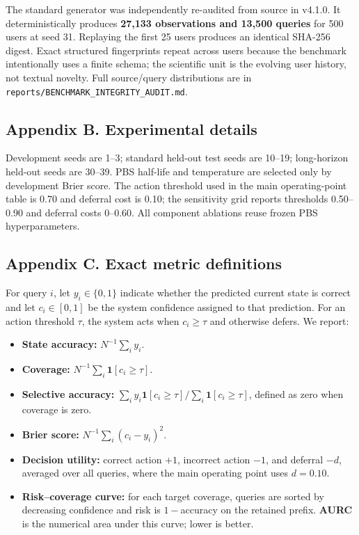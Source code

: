 \documentclass[
  10pt,
  letterpaper,
]{article}
\providecommand{\tightlist}{%
  \setlength{\itemsep}{0pt}\setlength{\parskip}{0pt}}
\begin{document}
The standard generator was independently re-audited from source in
v4.1.0. It deterministically produces \textbf{27,133 observations and
13,500 queries} for 500 users at seed 31. Replaying the first 25 users
produces an identical SHA-256 digest. Exact structured fingerprints
repeat across users because the benchmark intentionally uses a finite
schema; the scientific unit is the evolving user history, not textual
novelty. Full source/query distributions are in
\texttt{reports/BENCHMARK\_INTEGRITY\_AUDIT.md}.

\subsection{Appendix B. Experimental
details}\label{appendix-b.-experimental-details}

Development seeds are 1--3; standard held-out test seeds are 10--19;
long-horizon held-out seeds are 30--39. PBS half-life and temperature
are selected only by development Brier score. The action threshold used
in the main operating-point table is 0.70 and deferral cost is 0.10; the
sensitivity grid reports thresholds 0.50--0.90 and deferral costs
0--0.60. All component ablations reuse frozen PBS hyperparameters.

\subsection{Appendix C. Exact metric
definitions}\label{appendix-c.-exact-metric-definitions}

For query \(i\), let \(y_i\in\{0,1\}\) indicate whether the predicted
current state is correct and let \(c_i\in[0,1]\) be the system
confidence assigned to that prediction. For an action threshold
\(\tau\), the system acts when \(c_i\ge\tau\) and otherwise defers. We
report:

\begin{itemize}
\tightlist
\item
  \textbf{State accuracy:} \(N^{-1}\sum_i y_i\).
\item
  \textbf{Coverage:} \(N^{-1}\sum_i \mathbf{1}[c_i\ge\tau]\).
\item
  \textbf{Selective accuracy:}
  \(\sum_i y_i\mathbf{1}[c_i\ge\tau] / \sum_i \mathbf{1}[c_i\ge\tau]\),
  defined as zero when coverage is zero.
\item
  \textbf{Brier score:} \(N^{-1}\sum_i(c_i-y_i)^2\).
\item
  \textbf{Decision utility:} correct action \(+1\), incorrect action
  \(-1\), and deferral \(-d\), averaged over all queries, where the main
  operating point uses \(d=0.10\).
\item
  \textbf{Risk--coverage curve:} for each target coverage, queries are
  sorted by decreasing confidence and risk is \(1-\)accuracy on the
  retained prefix. \textbf{AURC} is the numerical area under this curve;
  lower is better.
\end{itemize}
\end{document}
